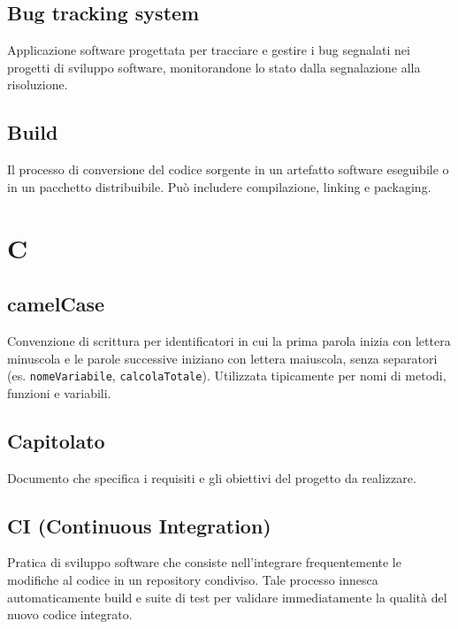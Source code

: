 \documentclass[a4paper, 11pt, oneside]{scrartcl} %
\begin{document}
\subsection*{Bug tracking system}
Applicazione software progettata per tracciare e gestire i bug segnalati nei progetti di sviluppo software, monitorandone lo stato dalla segnalazione alla risoluzione.
\vspace{0.5cm}

\subsection*{Build}
Il processo di conversione del codice sorgente in un artefatto software eseguibile o in un pacchetto distribuibile. Può includere compilazione, linking e packaging.
\vspace{0.5cm}



\section*{C}


\subsection*{camelCase}
Convenzione di scrittura per identificatori in cui la prima parola inizia con lettera minuscola e le parole successive iniziano con lettera maiuscola, senza separatori (es. \texttt{nomeVariabile}, \texttt{calcolaTotale}). Utilizzata tipicamente per nomi di metodi, funzioni e variabili.
\vspace{0.5cm}

\subsection*{Capitolato}
Documento che specifica i requisiti e gli obiettivi del progetto da realizzare.
\vspace{0.5cm}

\subsection*{CI (Continuous Integration)}
Pratica di sviluppo software che consiste nell'integrare frequentemente le modifiche al codice in un repository condiviso. Tale processo innesca automaticamente build e suite di test per validare immediatamente la qualità del nuovo codice integrato.
\vspace{0.5cm}
\end{document}
